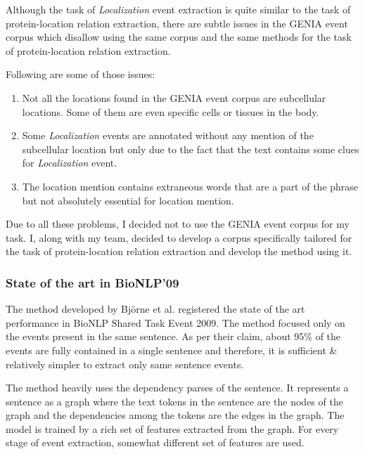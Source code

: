 Although the task of \textit{Localization} event extraction is quite similar to the task of protein-location relation extraction, there are subtle issues in the GENIA event corpus which disallow using the same corpus and the same methods for the task of protein-location relation extraction.

Following are some of those issues:

\begin{enumerate}

\item Not all the locations found in the GENIA event corpus are subcellular locations. Some of them are even specific cells or tissues in the body.

\item Some \textit{Localization} events are annotated without any mention of the subcellular location but only due to the fact that the text contains some clues for \textit{Localization} event.

\item The location mention contains extraneous words that are a part of the phrase but not absolutely essential for location mention.

\end{enumerate}

Due to all these problems, I decided not to use the GENIA event corpus for my task. I, along with my team, decided to develop a corpus specifically tailored for the task of protein-location relation extraction and develop the method using it.

\subsubsection{State of the art in BioNLP'09} \label{sec:JariBioNLP}

The method developed by Björne et al. \cite{bjorne2009extracting} registered the state of the art performance in BioNLP Shared Task Event 2009. The method focused only on the events present in the same sentence. As per their claim, about 95\% of the events are fully contained in a single sentence and therefore, it is sufficient \& relatively simpler to extract only same sentence events.

The method heavily uses the dependency parses of the sentence. It represents a sentence as a graph where the text tokens in the sentence are the nodes of the graph and the dependencies among the tokens are the edges in the graph. The model is trained by a rich set of features extracted from the graph. For every stage of event extraction, somewhat different set of features are used. 

